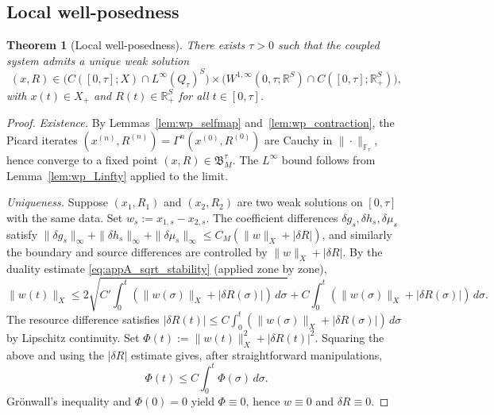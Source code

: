 \documentclass[pdflatex,sn-mathphys-num]{sn-jnl}%
\newtheorem{theorem}{Theorem}[section]
\begin{document}
\subsection{Local well-posedness}
\begin{theorem}[Local well-posedness]\label{thm:wp_local}
There exists \(\tau>0\) such that the coupled system admits a unique weak solution
\[
(x,R)\in
\big(C([0,\tau];X)\cap L^\infty(Q_\tau)^S\big)
\times
\big(W^{1,\infty}(0,\tau;\mathbb R^S)\cap C([0,\tau];\mathbb R_+^S)\big),
\]
with \(x(t)\in X_+\) and \(R(t)\in\mathbb R_+^S\) for all \(t\in[0,\tau]\).
\end{theorem}
\begin{proof}
\emph{Existence.}
By Lemmas~\ref{lem:wp_selfmap} and~\ref{lem:wp_contraction}, the Picard iterates
\((x^{(n)},R^{(n)})=\Gamma^n(x^{(0)},R^{(0)})\)
are Cauchy in \(\|\cdot\|_{\mathbb F_\tau}\), hence converge to a fixed point
\((x,R)\in\mathfrak B_M^\tau\).
The \(L^\infty\) bound follows from Lemma~\ref{lem:wp_Linfty} applied to the limit.

\emph{Uniqueness.}
Suppose \((x_1,R_1)\) and \((x_2,R_2)\) are two weak solutions on \([0,\tau]\) with the
same data. Set \(w_s:=x_{1,s}-x_{2,s}\). The coefficient differences
\(\delta g_s,\delta h_s,\delta\mu_s\) satisfy
\(\|\delta g_s\|_\infty+\|\delta h_s\|_\infty+\|\delta\mu_s\|_\infty
\le C_M(\|w\|_X+|\delta R|)\),
and similarly the boundary and source differences are controlled by
\(\|w\|_X+|\delta R|\).
By the duality estimate \eqref{eq:appA_sqrt_stability} (applied zone by zone),
\[
\|w(t)\|_X
\le
2\sqrt{C'\int_0^t(\|w(\sigma)\|_X+|\delta R(\sigma)|)\,d\sigma}
+C\int_0^t(\|w(\sigma)\|_X+|\delta R(\sigma)|)\,d\sigma.
\]
The resource difference satisfies
\(|\delta R(t)|\le C\int_0^t(\|w(\sigma)\|_X+|\delta R(\sigma)|)\,d\sigma\) by Lipschitz
continuity. Set \(\Phi(t):=\|w(t)\|_X^2+|\delta R(t)|^2\). Squaring the above and
using the \(|\delta R|\) estimate gives, after straightforward manipulations,
\[
\Phi(t)\le C\int_0^t\Phi(\sigma)\,d\sigma.
\]
Gr\"onwall's inequality and \(\Phi(0)=0\) yield \(\Phi\equiv 0\),
hence \(w\equiv 0\) and \(\delta R\equiv 0\).
\end{proof}
\end{document}

